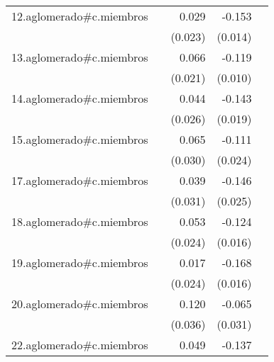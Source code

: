 {\begin{longtable}{l*{4}{D{.}{.}{-1}}}
\addlinespace
12.aglomerado#c.miembros&                     &       0.029         &      -0.153\sym{***}&                     \\
            &                     &     (0.023)         &     (0.014)         &                     \\
\addlinespace
13.aglomerado#c.miembros&                     &       0.066\sym{**} &      -0.119\sym{***}&                     \\
            &                     &     (0.021)         &     (0.010)         &                     \\
\addlinespace
14.aglomerado#c.miembros&                     &       0.044         &      -0.143\sym{***}&                     \\
            &                     &     (0.026)         &     (0.019)         &                     \\
\addlinespace
15.aglomerado#c.miembros&                     &       0.065\sym{*}  &      -0.111\sym{***}&                     \\
            &                     &     (0.030)         &     (0.024)         &                     \\
\addlinespace
17.aglomerado#c.miembros&                     &       0.039         &      -0.146\sym{***}&                     \\
            &                     &     (0.031)         &     (0.025)         &                     \\
\addlinespace
18.aglomerado#c.miembros&                     &       0.053\sym{*}  &      -0.124\sym{***}&                     \\
            &                     &     (0.024)         &     (0.016)         &                     \\
\addlinespace
19.aglomerado#c.miembros&                     &       0.017         &      -0.168\sym{***}&                     \\
            &                     &     (0.024)         &     (0.016)         &                     \\
\addlinespace
20.aglomerado#c.miembros&                     &       0.120\sym{***}&      -0.065\sym{*}  &                     \\
            &                     &     (0.036)         &     (0.031)         &                     \\
\addlinespace
22.aglomerado#c.miembros&                     &       0.049\sym{*}  &      -0.137\sym{***}&                     \\

\end{longtable}}
